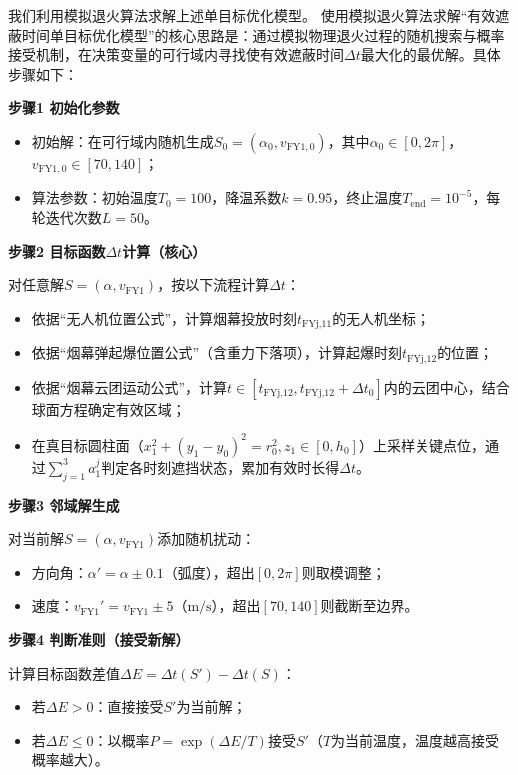 \documentclass[../main.tex]{subfiles}
\begin{document}

我们利用模拟退火算法求解上述单目标优化模型。
使用模拟退火算法求解“有效遮蔽时间单目标优化模型”的核心思路是：通过模拟物理退火过程的随机搜索与概率接受机制，在决策变量的可行域内寻找使有效遮蔽时间$\Delta t$最大化的最优解。具体步骤如下：

\noindent\textbf{步骤1 初始化参数}
\begin{itemize}
    \item 初始解：在可行域内随机生成$S_0=(\alpha_0, v_{\text{FY1},0})$，其中$\alpha_0 \in [0,2\pi]$，$v_{\text{FY1},0} \in [70,140]$；
    \item 算法参数：初始温度$T_0=100$，降温系数$k=0.95$，终止温度$T_{\text{end}}=10^{-5}$，每轮迭代次数$L=50$。
\end{itemize}

\noindent\textbf{步骤2 目标函数$\Delta t$计算（核心）}

对任意解$S=(\alpha, v_{\text{FY1}})$，按以下流程计算$\Delta t$：
\begin{itemize}
    \item 依据“无人机位置公式”，计算烟幕投放时刻$t_{\text{FYj,11}}$的无人机坐标；
    \item 依据“烟幕弹起爆位置公式”（含重力下落项），计算起爆时刻$t_{\text{FYj,12}}$的位置；
    \item 依据“烟幕云团运动公式”，计算$t \in [t_{\text{FYj,12}}, t_{\text{FYj,12}}+\Delta t_0]$内的云团中心，结合球面方程确定有效区域；
    \item 在真目标圆柱面（$x_1^2+(y_1-y_0)^2=r_0^2, z_1 \in [0,h_0]$）上采样关键点位，通过$\sum_{j=1}^3 a_1^j$判定各时刻遮挡状态，累加有效时长得$\Delta t$。
\end{itemize}

\noindent\textbf{步骤3 邻域解生成}

对当前解$S=(\alpha, v_{\text{FY1}})$添加随机扰动：
\begin{itemize}
    \item 方向角：$\alpha' = \alpha \pm 0.1$（弧度），超出$[0,2\pi]$则取模调整；
    \item 速度：$v_{\text{FY1}}' = v_{\text{FY1}} \pm 5$（$\text{m/s}$），超出$[70,140]$则截断至边界。
\end{itemize}

\noindent\textbf{步骤4  判断准则（接受新解）}

计算目标函数差值$\Delta E = \Delta t(S') - \Delta t(S)$：
\begin{itemize}
    \item 若$\Delta E > 0$：直接接受$S'$为当前解；
    \item 若$\Delta E \leq 0$：以概率$P = \exp(\Delta E/T)$接受$S'$（$T$为当前温度，温度越高接受概率越大）。
\end{itemize}
\end{document}
